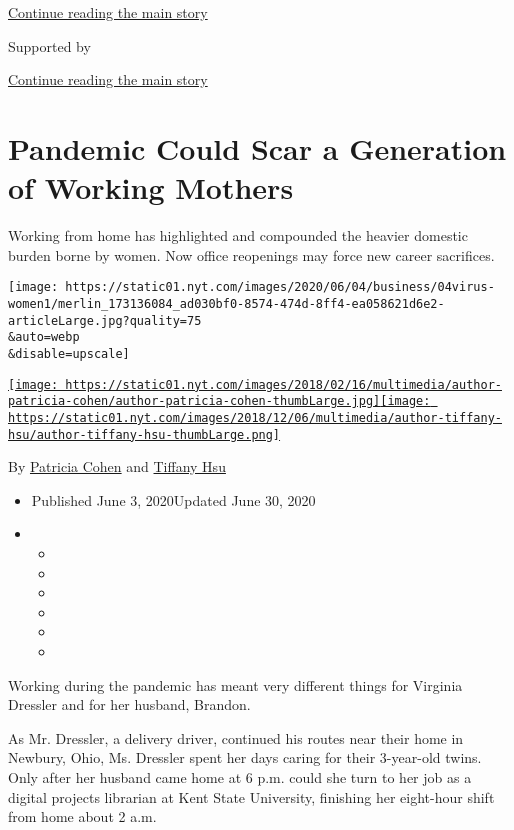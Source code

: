 \protect\hyperlink{after-top}{Continue reading the main story}

Supported by

\protect\hyperlink{after-sponsor}{Continue reading the main story}

\hypertarget{pandemic-could-scar-a-generation-of-working-mothers}{%
\section{Pandemic Could Scar a Generation of Working
Mothers}\label{pandemic-could-scar-a-generation-of-working-mothers}}

Working from home has highlighted and compounded the heavier domestic
burden borne by women. Now office reopenings may force new career
sacrifices.

\texttt{[image: https://static01.nyt.com/images/2020/06/04/business/04virus-women1/merlin\_173136084\_ad030bf0-8574-474d-8ff4-ea058621d6e2-articleLarge.jpg?quality=75\\\&auto=webp\\\&disable=upscale]}

\href{https://www.nytimes.com/by/patricia-cohen}{\texttt{[image: https://static01.nyt.com/images/2018/02/16/multimedia/author-patricia-cohen/author-patricia-cohen-thumbLarge.jpg]}}\href{https://www.nytimes.com/by/tiffany-hsu}{\texttt{[image: https://static01.nyt.com/images/2018/12/06/multimedia/author-tiffany-hsu/author-tiffany-hsu-thumbLarge.png]}}

By \href{https://www.nytimes.com/by/patricia-cohen}{Patricia Cohen} and
\href{https://www.nytimes.com/by/tiffany-hsu}{Tiffany Hsu}

\begin{itemize}
\item
  Published June 3, 2020Updated June 30, 2020
\item
  \begin{itemize}
  \item
  \item
  \item
  \item
  \item
  \item
  \end{itemize}
\end{itemize}

Working during the pandemic has meant very different things for Virginia
Dressler and for her husband, Brandon.

As Mr. Dressler, a delivery driver, continued his routes near their home
in Newbury, Ohio, Ms. Dressler spent her days caring for their
3-year-old twins. Only after her husband came home at 6 p.m. could she
turn to her job as a digital projects librarian at Kent State
University, finishing her eight-hour shift from home about 2 a.m.

